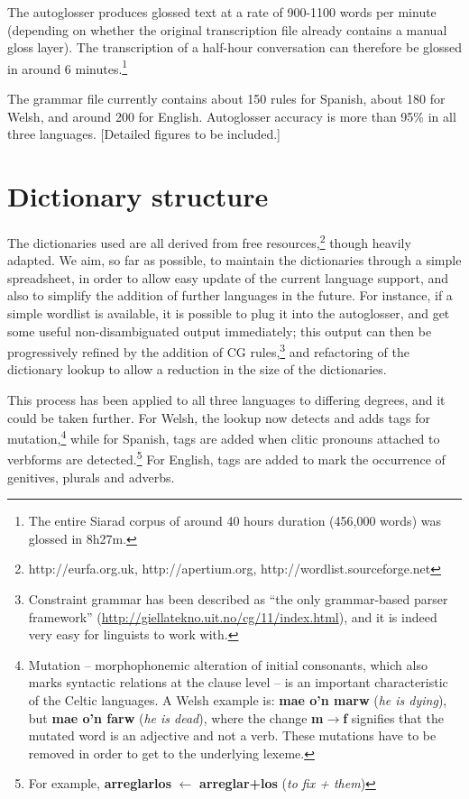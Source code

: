 \documentclass[11pt]{article}
\begin{document}
The autoglosser produces glossed text at a rate of 900-1100 words per minute (depending on whether the original transcription file already contains a manual gloss layer).  The transcription of a half-hour conversation can therefore be glossed in around 6 minutes.\footnote{The entire Siarad corpus of around 40 hours duration (456,000 words) was glossed in 8h27m.} 

The grammar file currently contains about 150 rules for Spanish, about 180 for Welsh, and around 200 for English.  Autoglosser accuracy is more than 95\% in all three languages. [Detailed figures to be included.]

\section{Dictionary structure}
\label{sec:dictionary}

The dictionaries used are all derived from free resources,\footnote{http://eurfa.org.uk, http://apertium.org, http://wordlist.sourceforge.net} though heavily adapted.  We aim, so far as possible, to maintain the dictionaries through a simple spreadsheet, in order to allow easy update of the current language support, and also to simplify the addition of further languages in the future.  For instance, if a simple wordlist is available, it is possible to plug it into the autoglosser, and get some useful non-disambiguated output immediately; this output can then be progressively refined by the addition of CG rules,\footnote{Constraint grammar has been described as ``the only grammar-based parser framework'' (\url{http://giellatekno.uit.no/cg/11/index.html}), and it is indeed very easy for linguists to work with.} and refactoring of the dictionary lookup to allow a reduction in the size of the dictionaries. 

This process has been applied to all three languages to differing degrees, and it could be taken further.  For Welsh, the lookup now detects and adds tags for mutation,\footnote{Mutation -- morphophonemic alteration of initial consonants, which also marks syntactic relations at the clause level -- is an important characteristic of the Celtic languages. A Welsh example is: \textbf{mae o'n marw} (\textit{he is dying}), but \textbf{mae o'n farw} (\textit{he is dead}), where the change \textbf{m$\rightarrow$f} signifies that the mutated word is an adjective and not a verb. These mutations have to be removed in order to get to the underlying lexeme.} while for Spanish, tags are added when clitic pronouns attached to verbforms are detected.\footnote{For example, \textbf{arreglarlos} $\leftarrow$ \textbf{arreglar+los} (\textit{to fix + them})}  For English, tags are added to mark the occurrence of genitives, plurals and adverbs.
\end{document}
